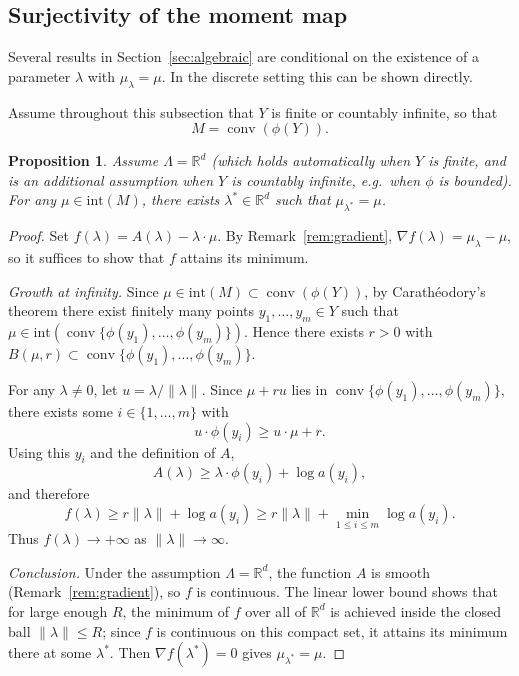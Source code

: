 \documentclass[11pt, a4paper, 
onecolumn, 
showabstract]{naverlabseurope-onecol-flex}
\newtheorem{proposition}[theorem]{Proposition}
\theoremstyle{definition}
\theoremstyle{remark}
\newcommand{\R}{\mathbb{R}}
\begin{document}
\subsection{Surjectivity of the moment map}\label{sec:surjectivity}

Several results in Section~\ref{sec:algebraic} are conditional on the existence of a
parameter $\lambda$ with $\mu_\lambda=\mu$. In the discrete setting this can be shown
directly.

Assume throughout this subsection that $Y$ is finite or countably infinite, so that
\[
M=\operatorname{conv}(\phi(Y)).
\]

\begin{proposition}\label{prop:surjectivity}
Assume $\Lambda=\R^d$ (which holds automatically when $Y$ is finite, and is an additional
assumption when $Y$ is countably infinite, e.g.\ when $\phi$ is bounded).
For any $\mu\in\mathrm{int}(M)$, there exists $\lambda^*\in\R^d$ such that
$\mu_{\lambda^*}=\mu$.
\end{proposition}

\begin{proof}
Set $f(\lambda)=A(\lambda)-\lambda\cdot\mu$.
By Remark~\ref{rem:gradient}, $\nabla f(\lambda)=\mu_\lambda-\mu$,
so it suffices to show that $f$ attains its minimum.

\medskip\noindent\emph{Growth at infinity.}
Since $\mu\in\mathrm{int}(M)\subset\operatorname{conv}(\phi(Y))$, by Carath\'eodory's theorem there
exist finitely many points $y_1,\dots,y_m\in Y$ such that
$\mu\in\mathrm{int}(\operatorname{conv}\{\phi(y_1),\dots,\phi(y_m)\})$.
Hence there exists $r>0$ with $B(\mu,r)\subset\operatorname{conv}\{\phi(y_1),\dots,\phi(y_m)\}$.

For any $\lambda\neq 0$, let $u=\lambda/\|\lambda\|$. Since $\mu+ru$ lies in
$\operatorname{conv}\{\phi(y_1),\dots,\phi(y_m)\}$, there exists some $i\in\{1,\dots,m\}$ with
\[
u\cdot\phi(y_i)\ge u\cdot\mu+r.
\]
Using this $y_i$ and the definition of $A$,
\[
A(\lambda)
\ge \lambda\cdot\phi(y_i)+\log a(y_i),
\]
and therefore
\[
f(\lambda)
\ge r\|\lambda\|+\log a(y_i)
\ge r\|\lambda\|+\min_{1\le i\le m}\log a(y_i).
\]
Thus $f(\lambda)\to+\infty$ as $\|\lambda\|\to\infty$.

\medskip\noindent\emph{Conclusion.}
Under the assumption $\Lambda=\R^d$, the function $A$ is smooth
(Remark~\ref{rem:gradient}), so $f$ is continuous. The linear lower bound shows that
for large enough $R$, the minimum of $f$ over all of $\R^d$ is achieved inside the
closed ball $\|\lambda\|\le R$; since $f$ is continuous on this compact set, it attains
its minimum there at some $\lambda^*$. Then $\nabla f(\lambda^*)=0$ gives
$\mu_{\lambda^*}=\mu$.
\end{proof}
\end{document}
